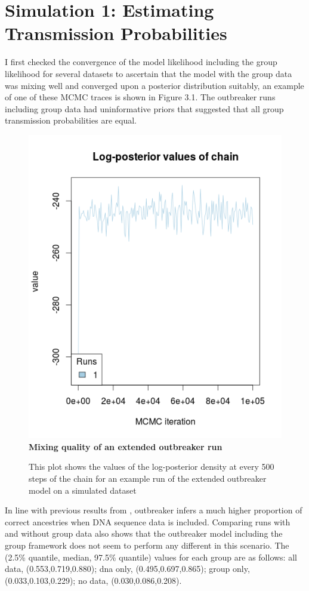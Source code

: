 \documentclass[11pt,a4paper]{report}
\begin{document}
\section{Simulation 1: Estimating Transmission Probabilities}
I first checked the convergence of the model likelihood including the group likelihood for several datasets to ascertain that the model with the group data was mixing well and converged upon a posterior distribution suitably, an example of one of these MCMC traces is shown in Figure 3.1. The outbreaker runs including group data had uninformative priors that suggested that all group transmission probabilities are equal. 
\begin{figure}
\centering
\includegraphics[scale=0.6]{trace.png}
\newline
{\bf Mixing quality of an extended outbreaker run}
\caption{This plot shows the values of the log-posterior density at every 500 steps of the chain for an example run of the extended outbreaker model on a simulated dataset}
\end{figure}
In line with previous results from \citet{outbrkr}, outbreaker infers a much higher proportion of correct ancestries when DNA sequence data is included. Comparing runs with and without group data also shows that the outbreaker model including the group framework does not seem to perform any different in this scenario. The (2.5\% quantile, median, 97.5\% quantile) values for each group are as follows: all data, (0.553,0.719,0.880); dna only, (0.495,0.697,0.865); group only, (0.033,0.103,0.229); no data, (0.030,0.086,0.208).
\end{document}
